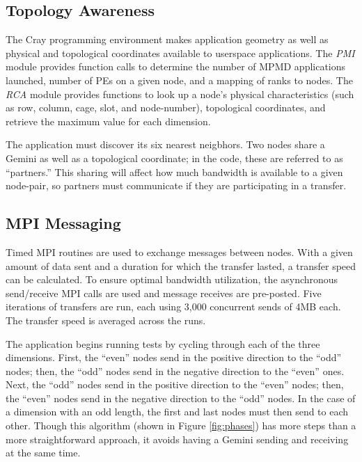 \documentclass[10pt, conference, compsocconf]{IEEEtran}
\begin{document}
\subsection{Topology Awareness}

The Cray programming environment makes application geometry as well as physical
and topological coordinates available to userspace applications.  The
\emph{PMI} module provides function calls to determine the number of MPMD
applications launched, number of PEs on a given node, and a mapping of ranks to
nodes.  The \emph{RCA} module provides functions to look up a node's physical
characteristics (such as row, column, cage, slot, and node-number), topological
coordinates, and retrieve the maximum value for each dimension.

The application must discover its six nearest neigbhors.  Two nodes share a
Gemini as well as a topological coordinate;  in the code, these are referred to
as ``partners.''  This sharing will affect how much bandwidth is available to a
given node-pair, so partners must communicate if they are participating in a
transfer.

\subsection{MPI Messaging}

Timed MPI routines are used to exchange messages between nodes.  With a given
amount of data sent and a duration for which the transfer lasted, a transfer
speed can be calculated.  To ensure optimal bandwidth utilization, the
asynchronous send/receive MPI calls are used and message receives are
pre-posted.  Five iterations of transfers are run, each using 3,000 concurrent
sends of 4MB each.  The transfer speed is averaged across the runs.

The application begins running tests by cycling through each of the three
dimensions.  First, the ``even'' nodes send in the positive direction to the
``odd'' nodes;  then, the ``odd'' nodes send in the negative direction to the
``even'' ones.  Next, the ``odd'' nodes send in the positive direction to the
``even'' nodes; then, the ``even'' nodes send in the negative direction to the
``odd'' nodes.  In the case of a dimension with an odd length, the first and
last nodes must then send to each other.  Though this algorithm (shown in
Figure \ref{fig:phases}) has more steps than a more straightforward approach,
it avoids having a Gemini sending and receiving at the same time.
\end{document}
